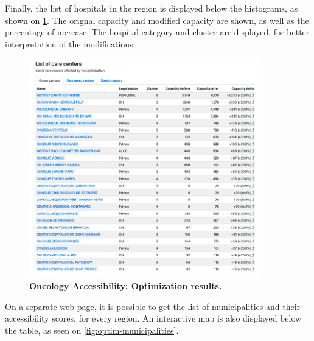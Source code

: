 Finally, the list of hospitals in the region is displayed below the histograms,
as shown on \cref{fig:optim-grown-hospitals}. The orignal capacity and modified
capacity are shown, as well as the percentage of increase. The hospital category
and cluster are displayed, for better interpretation of the modifications.

\begin{figure}[H]
    \includegraphics[width=0.9\textwidth]{images/oncology-accessibility/optim-paca-grown-hospitals.png}
    \centering
    \caption{
        \textbf{Oncology Accessibility: Optimization results.}
    }
    \label{fig:optim-grown-hospitals}
\end{figure}

On a separate web page, it is possible to get the list of municipalities and
their accessibility scores, for every region. An interactive map is also
displayed below the table, as seen on \cref{fig:optim-municipalities}.

